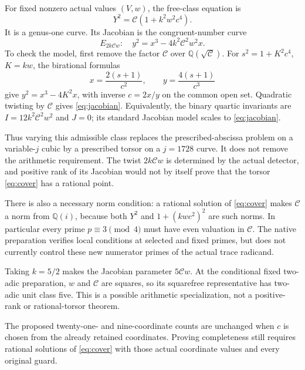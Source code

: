 \documentclass[11pt,a4paper]{article}
\newcommand{\Q}{\mathbb Q}
\begin{document}
For fixed nonzero actual values $(V,w)$, the free-class equation is
\begin{equation}\label{eq:cover}
                   Y^2=\mathcal C(1+k^2w^2c^4).
\end{equation}
It is a genus-one curve. Its Jacobian is the congruent-number curve
\begin{equation}\label{eq:jacobian}
           E_{2k\mathcal Cw}:\quad
           y^2=x^3-4k^2\mathcal C^2w^2x.
\end{equation}
To check the model, first remove the factor $\mathcal C$ over
$\Q(\sqrt{\mathcal C})$. For $s^2=1+K^2c^4$, $K=kw$, the
birational formulas
\[
                   x=\frac{2(s+1)}{c^2},\qquad
                   y=\frac{4(s+1)}{c^3}
\]
give $y^2=x^3-4K^2x$, with inverse $c=2x/y$ on the common open
set. Quadratic twisting by $\mathcal C$ gives
\eqref{eq:jacobian}. Equivalently, the binary quartic invariants are
$I=12k^2\mathcal C^2w^2$ and $J=0$; its standard Jacobian model
scales to \eqref{eq:jacobian}.

Thus varying this admissible class replaces the prescribed-abscissa
problem on a variable-$j$ cubic by a prescribed torsor on a $j=1728$
curve. It does not remove the arithmetic requirement. The twist
$2k\mathcal Cw$ is determined by the actual detector, and positive
rank of its Jacobian would not by itself prove that the torsor
\eqref{eq:cover} has a rational point.

There is also a necessary norm condition: a rational solution of
\eqref{eq:cover} makes $\mathcal C$ a norm from $\Q(i)$, because
both $Y^2$ and $1+(kwc^2)^2$ are such norms. In particular every
prime $p\equiv3\pmod4$ must have even valuation in $\mathcal C$.
The native preparation verifies local conditions at selected and
fixed primes, but does not currently control these new numerator
primes of the actual trace radicand.

Taking $k=5/2$ makes the Jacobian parameter $5\mathcal Cw$.
At the conditional fixed two-adic preparation, $w$ and $\mathcal C$
are squares, so its squarefree representative has two-adic unit
class five. This is a possible arithmetic specialization, not a
positive-rank or rational-torsor theorem.

The proposed twenty-one- and nine-coordinate counts are unchanged
when $c$ is chosen from the already retained coordinates. Proving
completeness still requires rational solutions of \eqref{eq:cover}
with those actual coordinate values and every original guard.
\end{document}
